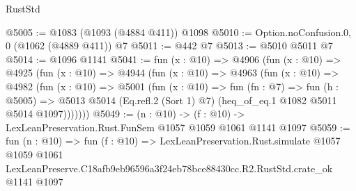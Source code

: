 \begin{lexlean}{RustStd}
\begin{coremodule}
@5005 := @1083 (@1093 (@4884 @411)) @1098
@5010 := Option.noConfusion.{0, 0} (@1062 (@4889 @411)) @7
@5011 := @442 @7
@5013 := @5010 @5011 @7
@5014 := @1096 @1141
@5041 := fun (x : @10) =>
  @4906
    (fun (x : @10) =>
    @4925
      (fun (x : @10) =>
      @4944
        (fun (x : @10) =>
        @4963
          (fun (x : @10) =>
          @4982
            (fun (x : @10) =>
            @5001
              (fun (x : @10) =>
              fun (fn : @7) =>
              fun (h : @5005) =>
              @5013 @5014 (Eq.refl.{2} (Sort 1) @7) (heq_of_eq.{1} @1082 @5011 @5014 @1097)))))))
@5049 := (n : @10) -> (f : @10) -> LexLeanPreservation.Rust.FunSem @1057 @1059 @1061 @1141 @1097
@5059 := fun (n : @10) =>
  fun (f : @10) =>
  LexLeanPreservation.Rust.simulate
    @1057
    @1059
    @1061
    LexLeanPreserve.C18afb9eb96596a3f24eb78bce88430cc.R2.RustStd.crate_ok
    @1141
    @1097
\end{coremodule}
\end{lexlean}

